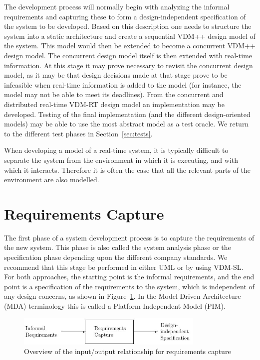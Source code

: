 \documentclass{overturerepchap}
\begin{document}
The development process will normally begin with analyzing the
informal requirements and capturing these to form a design-independent
specification of the system to be developed. Based on this description
one needs to structure the system into a static architecture and
create a sequential VDM++ design model of the system. This model would
then be extended to become a concurrent VDM++ design model. The
concurrent design model itself is then extended with real-time
information. At this stage it may prove necessary to revisit the
concurrent design model, as it may be that design decisions made at
that stage prove to be infeasible when real-time information is added
to the model (for instance, the model may not be able to meet its
deadlines). From the concurrent and distributed real-time VDM-RT design
model an implementation may be developed.  Testing of the final
implementation (and the different design-oriented models) may be able
to use the most abstract model as a test oracle. We return to the
different test phases in Section~\ref{sec:tests}.

When developing a model of a real-time system, it is typically
difficult to separate the system from the environment in which it is
executing, and with which it interacts.  Therefore it is often the
case that all the relevant parts of the environment are also modelled.

\section{Requirements Capture}

The first phase of a system development process is to capture the
requirements of the new system. This phase is also called the system
analysis phase or the specification phase depending upon the different
company standards. We recommend that this stage be performed in either
UML or by using VDM-SL. For both approaches, the starting point is the
informal requirements, and the end point is a specification of the
requirements to the system, which is independent of any design
concerns, as shown in Figure~\ref{fig:inputoutput}. In the Model
Driven Architecture (MDA) \cite{MDA} terminology this is called a
Platform Independent Model (PIM).

\begin{figure}
\begin{center}
\includegraphics[width=0.8\textwidth]{figures/reqcapture.jpg}
\end{center}
\caption{Overview of the input/output relationship for requirements capture}\label{fig:inputoutput}
\end{figure}
\end{document}
